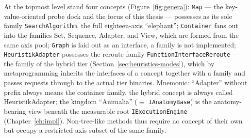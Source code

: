 \begin{nurkurz}
At the topmost level stand four concepts (Figure~\ref{fig:genera}): \texttt{Map} --- the key-value-oriented
probe dock and the focus of this thesis --- possesses as its sole family \texttt{SearchAlgorithm}, the full
eighteen-axis \enquote{elephant}; \texttt{Container} fans out into the families Set, Sequence, Adapter, and
View, which are formed from the same axis pool; \texttt{Graph} is laid out as an interface, a family is not
implemented; \texttt{HeuristikAdapter} possesses the reroute family \texttt{FunctionInterfaceReroute} ---
the family of the hybrid tier (Section~\ref{sec:heuristics-modes}), which by metaprogramming inherits the
interfaces of a concept together with a family and passes requests through to the actual tier binaries.
Mnemonic: \enquote{Adapter} without prefix always means the container family, the hybrid concept is always
called HeuristikAdapter; the kingdom \enquote{Animalia} ($\equiv$ \texttt{IAnatomyBase}) is the
anatomy-bearing view beneath the measurable root \texttt{IExecutionEngine} (Chapter~\ref{ch:impl}).
Non-tree-like methods thus require no concept of their own but occupy a restricted axis subset of the same
family.
\begin{figure}[htbp]\centering
\end{figure}
\end{nurkurz}
